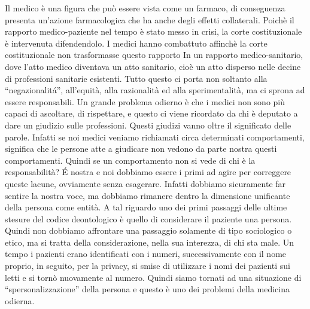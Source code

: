 Il medico è una figura che può essere vista come un farmaco, di
conseguenza presenta un'azione farmacologica che ha anche degli effetti
collaterali. Poichè il rapporto medico-paziente nel tempo è stato messo
in crisi, la corte costituzionale è intervenuta difendendolo. I medici
hanno combattuto affinchè la corte costituzionale non trasformasse
questo rapporto In un rapporto medico-sanitario, dove l'atto medico
diventava un atto sanitario, cioè un atto disperso nelle decine di
professioni sanitarie esistenti. Tutto questo ci porta non soltanto alla
``negazionalitá'', all'equità, alla razionalità ed alla sperimentalità,
ma ci sprona ad essere responsabili. Un grande problema odierno è che i
medici non sono più capaci di ascoltare, di rispettare, e questo ci
viene ricordato da chi è deputato a dare un giudizio sulle professioni.
Questi giudizi vanno oltre il significato delle parole. Infatti se noi
medici veniamo richiamati circa determinati comportamenti, significa che
le persone atte a giudicare non vedono da parte nostra questi
comportamenti. Quindi se un comportamento non si vede di chi è la
responsabilità? É nostra e noi dobbiamo essere i primi ad agire per
correggere queste lacune, ovviamente senza esagerare. Infatti dobbiamo
sicuramente far sentire la nostra voce, ma dobbiamo rimanere dentro la
dimensione unificante della persona come entità. A tal riguardo uno dei
primi passaggi delle ultime stesure del codice deontologico è quello di
considerare il paziente una persona. Quindi non dobbiamo affrontare una
passaggio solamente di tipo sociologico o etico, ma si tratta della
considerazione, nella sua interezza, di chi sta male. Un tempo i
pazienti erano identificati con i numeri, successivamente con il nome
proprio, in seguito, per la privacy, si smise di utilizzare i nomi dei
pazienti sui letti e si tornò nuovamente al numero. Quindi siamo tornati
ad una situazione di ``spersonalizzazione'' della persona e questo è uno
dei problemi della medicina odierna.

